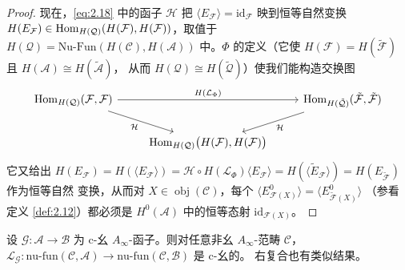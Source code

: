 \begin{proof}
现在，\eqref{eq:2.18} 中的函子 $\mathcal H$ 把 $\langle E_{\mathcal F}\rangle=
\mathrm{id}_{\mathcal F}$ 映到恒等自然变换 $H(E_{\mathcal F})\in
\operatorname{Hom}_{H(\mathcal Q)}(H(\mathcal F),H(\mathcal F))$，取值于 $H(\mathcal Q)=
\mathrm{Nu\text{-}Fun}(H(\mathcal C),H(\mathcal A))$ 中。$\Phi$ 的定义（它使
$H(\mathcal F)=H(\tilde{\mathcal F})$ 且 $H(\mathcal A)\cong H(\tilde{\mathcal A})$，
从而 $H(\mathcal Q)\cong H(\tilde{\mathcal Q})$）使我们能构造交换图
\[
  \begin{tikzcd}
    \Hom_{H(\mathcal Q)}(\mathcal F,\mathcal F)
      \arrow[rr, "H(\mathcal L_{\Phi})"]
      \arrow[dr, "\mathcal H"'] & &
    \Hom_{H(\tilde{\mathcal Q})}(\tilde{\mathcal F},\tilde{\mathcal F})
      \arrow[dl, "\mathcal H"] \\
    & \Hom_{H(\mathcal Q)}\bigl(H(\mathcal F),H(\mathcal F)\bigr) &
  \end{tikzcd}
\]
它又给出 $H(E_{\mathcal F})=H(\langle E_{\mathcal F}\rangle)=
\mathcal H\circ H(\mathcal L_{\Phi})\langle E_{\mathcal F}\rangle=
H(\langle\tilde E_{\mathcal F}\rangle)=H(E_{\tilde{\mathcal F}})$ 作为恒等自然
变换，从而对 $X\in\operatorname{obj}(\mathcal C)$，每个
$\langle E^0_{\mathcal F(X)}\rangle=\langle E^0_{\tilde{\mathcal F}(X)}\rangle$
（参看定义 \ref{def:2.12}）都必须是 $H^0(\mathcal A)$ 中的恒等态射
$\mathrm{id}_{\mathcal F(X)}$。
\end{proof}

\begin{Lem}\label{lem:2.27}
设 $\mathcal G:\mathcal A\to\mathcal B$ 为 c-幺 $A_\infty$-函子。则对任意非幺
$A_\infty$-范畴 $\mathcal C$，$\mathcal L_{\mathcal G}:\mathrm{nu\text{-}fun}
(\mathcal C,\mathcal A)\to\mathrm{nu\text{-}fun}(\mathcal C,\mathcal B)$ 是 c-幺的。
右复合也有类似结果。
\end{Lem}

